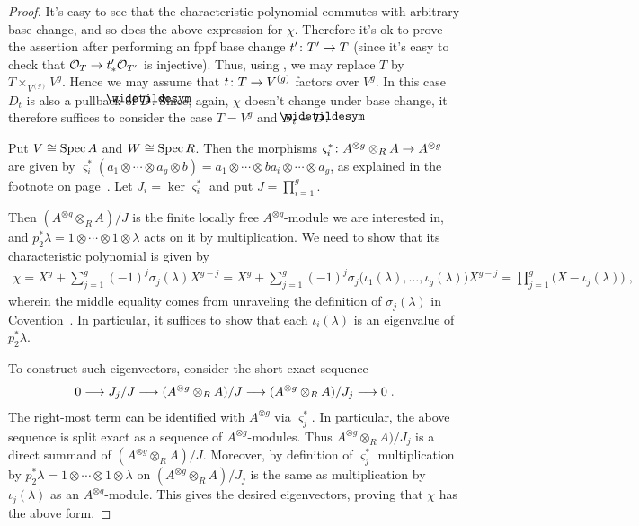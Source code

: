 \documentclass[a4paper,parskip=half,numbers=enddot, DIV=12]{scrreprt}
\begin{document}
\begin{proof}
	It's easy to see that the characteristic polynomial commutes with arbitrary base change, and so does the above expression for $\chi$. Therefore it's ok to prove the assertion after performing an fppf base change  $t'\colon T'\morphism T$ (since it's easy to check that $\Oo_T\morphism t'_*\Oo_{T'}$ is injective). Thus, using , we may replace $T$ by $T\times_{V^{(g)}}V^g$. Hence we may assume that $t\colon T\morphism V^{(g)}$ factors over $V^g$. In this case $D_t$ is also a pullback of $\snake{D}$. Since, again, $\chi$ doesn't change under base change, it therefore suffices to consider the case $T=V^g$ and $D_t=\snake{D}$.
	
	 Put $V\cong \operatorname{Spec} A$ and $W\cong \operatorname{Spec} R$. Then the morphisms $\varsigma_i^*\colon A^{\otimes g}\otimes_RA\morphism A^{\otimes g}$ are given by $\varsigma_i^*(a_1\otimes\cdots\otimes a_g\otimes b)=a_1\otimes\cdots \otimes ba_i\otimes\cdots\otimes a_g$, as explained in the footnote on page~\pageref{footnote:varsigmai}. Let $J_i=\ker\varsigma_i^*$ and put $J=\prod_{i=1}^g$.
	 
	 Then $(A^{\otimes g}\otimes_RA)/J$ is the finite locally free $A^{\otimes g}$-module we are interested in, and $p_2^*\lambda=1\otimes\cdots\otimes 1\otimes \lambda$ acts on it by multiplication. We need to show that its characteristic polynomial is given by
	 \begin{align*}
	 	\chi=X^g+\sum_{j=1}^g(-1)^j\sigma_j(\lambda)X^{g-j}=X^g+\sum_{j=1}^g(-1)^j\sigma_j\big(\iota_1(\lambda),\ldots,\iota_g(\lambda)\big)X^{g-j}=\prod_{j=1}^g\big(X-\iota_j(\lambda)\big)\;,
	 \end{align*}
	 wherein the middle equality comes from unraveling the definition of $\sigma_j(\lambda)$ in Covention~. In particular, it suffices to show that each $\iota_i(\lambda)$ is an eigenvalue of $p_2^*\lambda$.
	 
	 To construct such eigenvectors, consider the short exact sequence
	 \begin{align*}
	 	0\morphism J_j/J\morphism (A^{\otimes g}\otimes_RA)/J\morphism (A^{\otimes g}\otimes_RA)/J_j\morphism 0\;.
	 \end{align*}
	 The right-most term can be identified with $A^{\otimes g}$ via $\varsigma_j^*$. In particular, the above sequence is split exact as a sequence of $A^{\otimes g}$-modules. Thus $A^{\otimes g}\otimes_RA)/J_j$ is a direct summand of $(A^{\otimes g}\otimes_RA)/J$. Moreover, by definition of $\varsigma_j^*$ multiplication by $p_2^*\lambda=1\otimes\cdots\otimes 1\otimes \lambda$ on $(A^{\otimes g}\otimes_RA)/J_j$ is the same as multiplication by $\iota_j(\lambda)$ as an $A^{\otimes g}$-module. This gives the desired eigenvectors, proving that $\chi$ has the above form.
	 

\end{proof}
\end{document}
